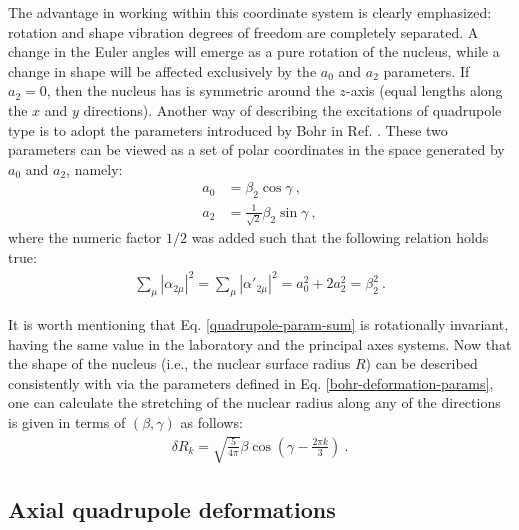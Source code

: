 The advantage in working within this coordinate system is clearly emphasized: rotation and shape vibration degrees of freedom are completely separated. A change in the Euler angles will emerge as a pure rotation of the nucleus, while a change in shape will be affected exclusively by the $a_0$ and $a_2$ parameters. If $a_2=0$, then the nucleus has is symmetric around the $z$-axis (equal lengths along the $x$ and $y$ directions). Another way of describing the excitations of quadrupole type is to adopt the parameters introduced by Bohr in Ref. \cite{bohr1954rotational}. These two parameters can be viewed as a set of polar coordinates in the space generated by $a_0$ and $a_2$, namely:
\begin{align}
    a_0&=\beta_2\cos\gamma\ , \nonumber \\
    a_2&=\frac{1}{\sqrt{2}}\beta_2\sin\gamma\ , \label{bohr-deformation-params}
\end{align}
where the numeric factor $1/2$ was added such that the following relation holds true:
\begin{align}
    \sum_\mu\left|\alpha_{2\mu}\right|^2=\sum_\mu\left|\alpha'_{2\mu}\right|^2=a_0^2+2a_2^2=\beta_2^2\ .
    \label{quadrupole-param-sum}
\end{align}

It is worth mentioning that Eq. \ref{quadrupole-param-sum} is rotationally invariant, having the same value in the laboratory and the principal axes systems. Now that the shape of the nucleus (i.e., the nuclear surface radius $R$) can be described consistently with via the parameters defined in Eq. \ref{bohr-deformation-params}, one can calculate the stretching of the nuclear radius along any of the directions is given in terms of $(\beta,\gamma)$ as follows:
\begin{align}
    \delta R_k=\sqrt{\frac{5}{4\pi}}\beta\cos(\gamma-\frac{2\pi k}{3})\ .
    \label{axes-stretching}
\end{align}

\subsection{Axial quadrupole deformations}

